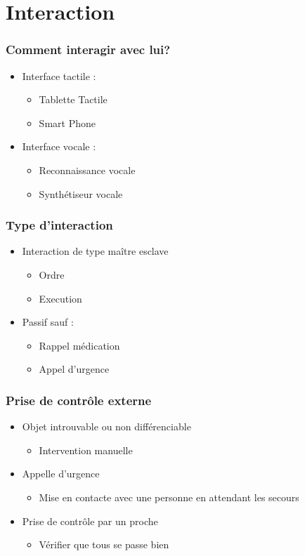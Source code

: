 \section{Interaction}
\begin{frame}
  \frametitle{Comment interagir avec lui?}
      	\begin{itemize}
      	\item Interface tactile :
        	\begin{itemize}
        	\item Tablette Tactile
        	\item Smart Phone 
        	\end{itemize}
	\item Interface vocale :
		\begin{itemize}
		\item Reconnaissance vocale
		\item Synthétiseur vocale
		\end{itemize}
      \end{itemize}
\end{frame}

\begin{frame}
	\frametitle{Type d'interaction}
	\begin{itemize}
	\item Interaction de type maître esclave
		\begin{itemize}
		\item Ordre
		\item Execution
		\end{itemize}
	\item Passif sauf :
		\begin{itemize}
		\item Rappel médication
		\item Appel d'urgence
		\end{itemize}
	\end{itemize}
\end{frame}

\begin{frame}
	\frametitle{Prise de contrôle externe}
	\begin{itemize}
	\item Objet introuvable ou non différenciable
		\begin{itemize}
		\item Intervention manuelle
		\end{itemize}
	\item Appelle d'urgence
		\begin{itemize}
		\item Mise en contacte avec une personne en attendant les secours
		\end{itemize}
	\item Prise de contrôle par un proche
		\begin{itemize}
		\item Vérifier que tous se passe bien
		\end{itemize}
	\end{itemize}
\end{frame}
